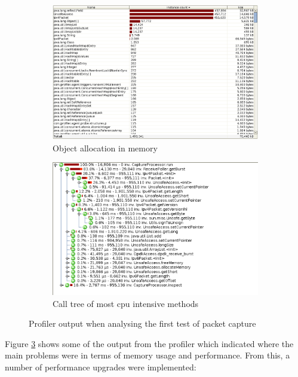 \documentclass[final_report.tex]{subfiles}
\begin{document}
\begin{figure}[H]
	\centering
	\begin{subfigure}{0.5\textwidth}
		\includegraphics[width=\textwidth]{../../data/pctest1/memory_all_objects.png}
		\caption{Object allocation in memory}
		\label{fig:mem1}
	\end{subfigure}%
	\begin{subfigure}{0.5\textwidth}
		\includegraphics[width=\textwidth]{../../data/pctest1/cpu_call_tree.png}
		\caption{Call tree of most cpu intensive methods}
		\label{fig:cpu1}
	\end{subfigure}
	\caption{Profiler output when analysing the first test of packet capture}
	\label{fig:pro1}
\end{figure}

Figure \ref{fig:pro1} shows some of the output from the profiler which indicated where the main problems were in terms of memory usage and performance. From this, a number of performance upgrades were implemented:
\end{document}
